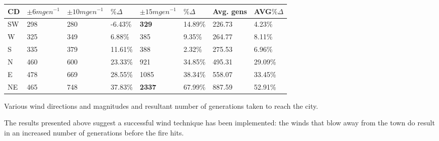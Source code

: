 \documentclass[11pt, a4paper, titlepage]{article}
\begin{document}
\begin{table}[h]
\begin{center}
      \begin{tabular}{|l|l|l|l|l|l|l|l|}
      \hline
      CD  & $\pm6mgen^{-1}$ & $\pm10mgen^{-1}$ & $\% \Delta$ & $\pm15mgen^{-1}$ & $\% \Delta$  & Avg. gens & AVG$\% \Delta$ \\ \hline
      SW & 298                                            & 280                                        & -6.43\% & \textbf{329}                                  & 14.89\% & 226.73                            & 4.23\%      \\ \hline
      W       & 325                                            & 349                                        & 6.88\%  & 385                                  & 9.35\%  & 264.77                            & 8.11\%      \\ \hline
      S      & 335                                            & 379                                        & 11.61\% & 388                                  & 2.32\%  & 275.53                            & 6.96\%      \\ \hline
      N      & 460                                            & 600                                        & 23.33\% & 921                                  & 34.85\% & 495.31                            & 29.09\%     \\ \hline
      E       & 478                                            & 669                                        & 28.55\% & 1085                                 & 38.34\% & 558.07                            & 33.45\%     \\ \hline
      NE & 465                                            & 748                                        & 37.83\% & \textbf{2337}                                 & 67.99\% & 887.59                            & 52.91\%     \\ \hline
      \end{tabular}
\end{center}
Various wind directions and magnitudes and resultant number of generations taken to reach the city.
    \end{table}

    The results presented above suggest a successful wind technique has been implemented: the winds that blow away from the town do result in an increased number of generations before the fire hits.
    
\end{document}
